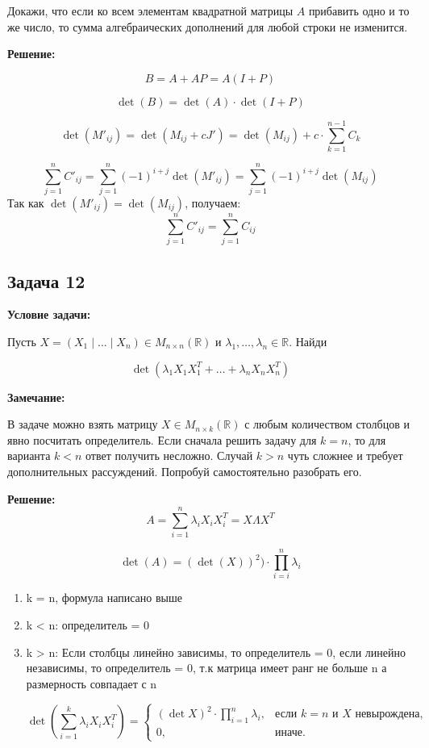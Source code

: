 \documentclass[a4paper,12pt]{article}
\begin{document}
Докажи, что если ко всем элементам квадратной матрицы \( A \) прибавить одно и то же число, то сумма алгебраических дополнений для любой строки не изменится.

\textbf{Решение:}

\[
B = A + AP = A(I + P)
\]

\[
\det(B) = \det(A) \cdot \det(I + P)
\]

\[
\det(M'_{ij}) = \det(M_{ij} + cJ') = \det(M_{ij}) + c \cdot \sum_{k=1}^{n-1} C_{k}
\]

\[
\sum_{j=1}^n C'_{ij} = \sum_{j=1}^n (-1)^{i+j} \det(M'_{ij}) = \sum_{j=1}^n (-1)^{i+j} \det(M_{ij})
\]
Так как \( \det(M'_{ij}) = \det(M_{ij}) \), получаем:
\[
\sum_{j=1}^n C'_{ij} = \sum_{j=1}^n C_{ij}
\]

\vspace{1cm}

\subsection{Задача 12}

\textbf{Условие задачи:}

Пусть \( X = (X_1 \mid \dots \mid X_n) \in M_{n \times n}(\mathbb{R}) \) и \( \lambda_1, \dots, \lambda_n \in \mathbb{R} \). Найди

\[
\det(\lambda_1 X_1 X_1^T + \dots + \lambda_n X_n X_n^T)
\]

\textbf{Замечание:}

В задаче можно взять матрицу \( X \in M_{n \times k}(\mathbb{R}) \) с любым количеством столбцов и явно посчитать определитель. Если сначала решить задачу для \( k = n \), то для варианта \( k < n \) ответ получить несложно. Случай \( k > n \) чуть сложнее и требует дополнительных рассуждений. Попробуй самостоятельно разобрать его.

\textbf{Решение:}
\[
A = \sum_{i=1}^{n}\lambda_i X_i X_i^T = X \Lambda X^T
\]

\[
\det(A) = (\det(X))^2) \cdot \prod_{i=i}^{n} \lambda_i
\]
\begin{enumerate}
    \item k = n, формула написано выше 
    \item k < n: определитель = 0
    \item k > n: Если столбцы линейно зависимы, то определитель = 0, если линейно независимы, то определитель = 0, т.к матрица имеет ранг не больше n а размерность совпадает с n

\[
\det\left( \sum_{i=1}^k \lambda_i X_i X_i^T \right) =
\begin{cases}
(\det X)^2 \cdot \prod_{i=1}^n \lambda_i, & \text{если } k = n \text{ и } X \text{ невырождена}, \\
0, & \text{иначе}.
\end{cases}
\]
\end{enumerate}
\vspace{1cm}
\end{document}
